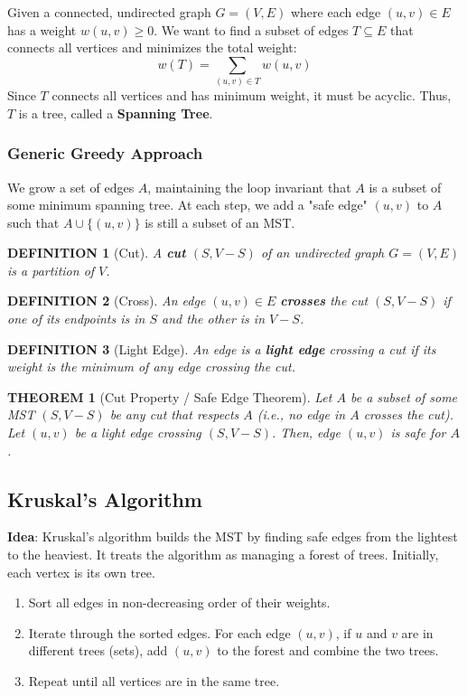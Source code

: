 \documentclass[12pt]{article}
\theoremstyle{blueplain}
\newtheorem{theorem}{THEOREM}[section]
\theoremstyle{bluedef}
\newtheorem{definition}{DEFINITION}[section]
\theoremstyle{blueremark}
\begin{document}
Given a connected, undirected graph $G=(V, E)$ where each edge $(u, v) \in E$ has a weight $w(u, v) \ge 0$. We want to find a subset of edges $T \subseteq E$ that connects all vertices and minimizes the total weight:
\[ w(T) = \sum_{(u, v) \in T} w(u, v) \]
Since $T$ connects all vertices and has minimum weight, it must be acyclic. Thus, $T$ is a tree, called a \textbf{Spanning Tree}.

\subsubsection{Generic Greedy Approach}

We grow a set of edges $A$, maintaining the loop invariant that $A$ is a subset of some minimum spanning tree. At each step, we add a "safe edge" $(u, v)$ to $A$ such that $A \cup \{(u, v)\}$ is still a subset of an MST.

\begin{definition}[Cut]
    A \textbf{cut} $(S, V-S)$ of an undirected graph $G=(V, E)$ is a partition of $V$.
\end{definition}

\begin{definition}[Cross]
    An edge $(u, v) \in E$ \textbf{crosses} the cut $(S, V-S)$ if one of its endpoints is in $S$ and the other is in $V-S$.
\end{definition}

\begin{definition}[Light Edge]
    An edge is a \textbf{light edge} crossing a cut if its weight is the minimum of any edge crossing the cut.
\end{definition}

\begin{theorem}[Cut Property / Safe Edge Theorem]
    Let $A$ be a subset of some MST $(S, V-S)$ be any cut that respects $A$ (i.e., no edge in $A$ crosses the cut). Let $(u, v)$ be a light edge crossing $(S, V-S)$. Then, edge $(u, v)$ is safe for $A$.
\end{theorem}

\subsection{Kruskal's Algorithm}

\textbf{Idea}: Kruskal's algorithm builds the MST by finding safe edges from the lightest to the heaviest. It treats the algorithm as managing a forest of trees. Initially, each vertex is its own tree.
\begin{enumerate}
    \item Sort all edges in non-decreasing order of their weights.
    \item Iterate through the sorted edges. For each edge $(u, v)$, if $u$ and $v$ are in different trees (sets), add $(u, v)$ to the forest and combine the two trees.
    \item Repeat until all vertices are in the same tree.
\end{enumerate}
\end{document}

